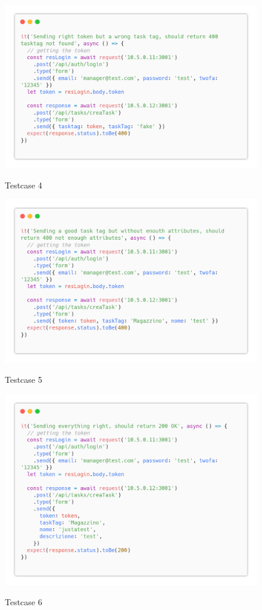 \documentclass{report}
\begin{document}
\begin{figure}[H]
	\centering\includegraphics[width=1\textwidth]{images/code_crea_task_test4.png}

	Testcase 4
\end{figure}
\begin{figure}[H]
	\centering\includegraphics[width=1\textwidth]{images/code_crea_task_test5.png}

	Testcase 5
\end{figure}
\begin{figure}[H]
	\centering\includegraphics[width=1\textwidth]{images/code_crea_task_test6.png}

	Testcase 6
\end{figure}
\end{document}
